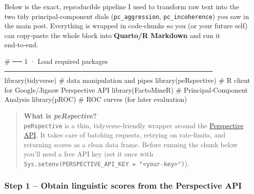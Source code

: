 \documentclass[
  letterpaper,
  DIV=11,
  numbers=noendperiod]{scrartcl}
\newenvironment{Shaded}{\begin{snugshade}}{\end{snugshade}}
\newcommand{\CommentTok}[1]{\textcolor[rgb]{0.37,0.37,0.37}{#1}}
\newcommand{\FunctionTok}[1]{\textcolor[rgb]{0.28,0.35,0.67}{#1}}
\newcommand{\NormalTok}[1]{\textcolor[rgb]{0.00,0.23,0.31}{#1}}
\begin{document}
\begin{tcolorbox}[enhanced jigsaw, coltitle=black, colframe=quarto-callout-note-color-frame, breakable, leftrule=.75mm, colbacktitle=quarto-callout-note-color!10!white, bottomtitle=1mm, toprule=.15mm, titlerule=0mm, rightrule=.15mm, title=\textcolor{quarto-callout-note-color}{\faInfo}\hspace{0.5em}{A Note on Advanced NLP Features}, arc=.35mm, opacitybacktitle=0.6, colback=white, left=2mm, toptitle=1mm, opacityback=0, bottomrule=.15mm]

Below is the exact, reproducible pipeline I used to transform raw text
into the two tidy principal‑component dials (\texttt{pc\_aggression},
\texttt{pc\_incoherence}) you saw in the main post. Everything is
wrapped in code‑chunks so you (or your future self) can copy‑paste the
whole block into \textbf{Quarto/R Markdown} and run it end‑to‑end.

\begin{Shaded}
\begin{Highlighting}[]
\CommentTok{\# ── 1 · Load required packages ───────────────────────────────────────────}
\FunctionTok{library}\NormalTok{(tidyverse)     }\CommentTok{\# data manipulation and pipes}
\FunctionTok{library}\NormalTok{(peRspective)   }\CommentTok{\# R client for Google/Jigsaw Perspective API}
\FunctionTok{library}\NormalTok{(FactoMineR)    }\CommentTok{\# Principal‑Component Analysis}
\FunctionTok{library}\NormalTok{(pROC)          }\CommentTok{\# ROC curves (for later evaluation)}
\end{Highlighting}
\end{Shaded}

\begin{quote}
\textbf{What is \emph{peRspective}?}\\
\texttt{peRspective} is a thin, tidyverse‑friendly wrapper around the
\href{https://developers.perspectiveapi.com/}{Perspective API}. It takes
care of batching requests, retrying on rate‑limits, and returning scores
as a clean data frame. Before running the chunk below you'll need a free
API key (set it once with
\texttt{Sys.setenv(PERSPECTIVE\_API\_KEY\ =\ "\textless{}your‑key\textgreater{}")}).
\end{quote}

\subsubsection{Step 1 -- Obtain linguistic scores from the Perspective
API}\label{step-1-obtain-linguistic-scores-from-the-perspective-api}


\end{tcolorbox}
\end{document}
